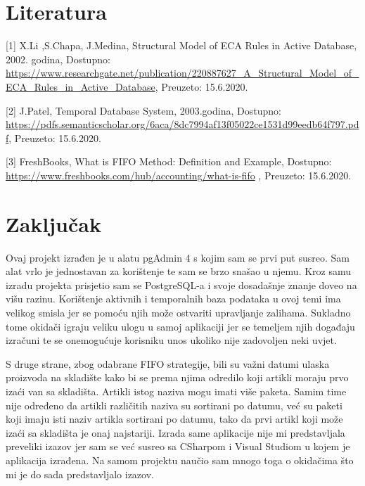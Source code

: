 \documentclass{foi}
\begin{document}
\chapter{Literatura}
[1] X.Li ,S.Chapa, J.Medina, Structural Model of ECA Rules in Active Database, 2002. godina,
Dostupno: \url{https://www.researchgate.net/publication/220887627_A_Structural_Model_of_ECA_Rules_in_Active_Database}, Preuzeto: 15.6.2020.

[2] J.Patel, Temporal Database System, 2003.godina, Dostupno:
\url{https://pdfs.semanticscholar.org/6aca/8dc7994af13f05022ce1531d99eedb64f797.pdf}, Preuzeto: 15.6.2020.

[3] FreshBooks, What is FIFO Method: Definition and Example, Dostupno: \url{https://www.freshbooks.com/hub/accounting/what-is-fifo} , Preuzeto: 15.6.2020.
\chapter{Zaključak}

Ovaj projekt izrađen je u alatu pgAdmin 4 s kojim sam se prvi put susreo. Sam alat vrlo je jednostavan za korištenje te sam se brzo snašao u njemu. Kroz samu izradu projekta prisjetio sam se PostgreSQL-a i svoje dosadašnje znanje doveo na višu razinu. Korištenje aktivnih i temporalnih baza podataka u ovoj temi ima velikog smisla jer se pomoću njih može ostvariti upravljanje zalihama. Sukladno tome okidači igraju veliku ulogu u samoj aplikaciji jer se temeljem njih događaju izračuni te se onemogućuje korisniku unos ukoliko nije zadovoljen neki uvjet. 

S druge strane, zbog odabrane FIFO strategije, bili su važni datumi ulaska proizvoda na skladište kako bi se prema njima odredilo koji artikli moraju prvo izaći van sa skladišta. Artikli istog naziva mogu imati više paketa. Samim time nije određeno da artikli različitih naziva su sortirani po datumu, već su paketi koji imaju isti naziv artikla sortirani po datumu, tako da prvi artikl koji može izaći sa skladišta je onaj najstariji.
Izrada same aplikacije nije mi predstavljala preveliki izazov jer sam se već susreo sa CSharpom i Visual Studiom u kojem je aplikacija izrađena. Na samom projektu naučio sam mnogo toga o okidačima što mi je do sada predstavljalo izazov.


\printbibliography[title=Popis literature]

\listoffigures
{}
 

\appendix
\renewcommand{\thechapter}{\arabic{chapter}}
\end{document}
